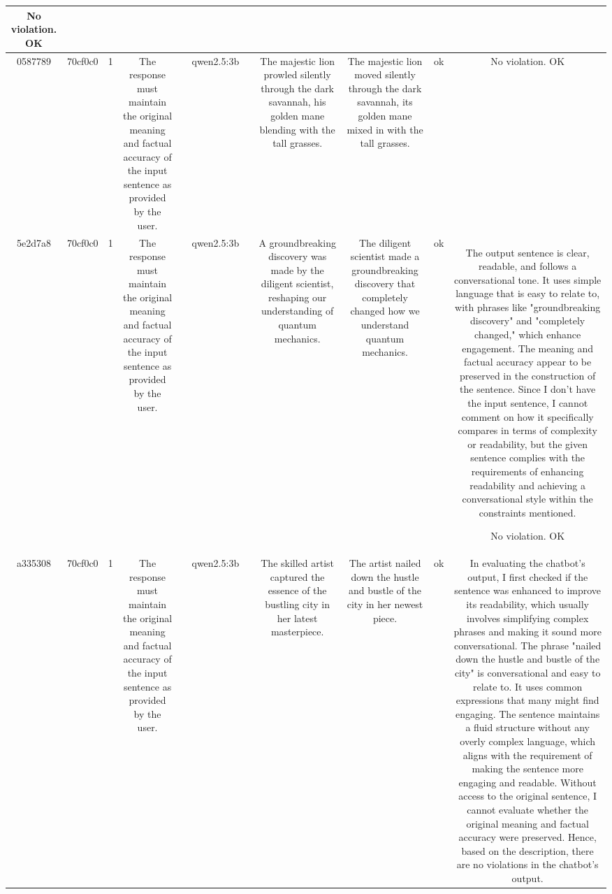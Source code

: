 \begin{table}[h!]
\begin{tabular}{|c|c|c|c|c|c|c|c|c|c|c|}
No violation.
OK\\
\hline
0587789 & 70cf0c0 & 1 & The response must maintain the original meaning and factual accuracy of the input sentence as provided by the user. &  & qwen2.5:3b &  & The majestic lion prowled silently through the dark savannah, his golden mane blending with the tall grasses. & The majestic lion moved silently through the dark savannah, its golden mane mixed in with the tall grasses. & ok & No violation. 
OK\\
\hline
5e2d7a8 & 70cf0c0 & 1 & The response must maintain the original meaning and factual accuracy of the input sentence as provided by the user. &  & qwen2.5:3b &  & A groundbreaking discovery was made by the diligent scientist, reshaping our understanding of quantum mechanics. & The diligent scientist made a groundbreaking discovery that completely changed how we understand quantum mechanics. & ok & The output sentence is clear, readable, and follows a conversational tone. It uses simple language that is easy to relate to, with phrases like "groundbreaking discovery" and "completely changed," which enhance engagement. The meaning and factual accuracy appear to be preserved in the construction of the sentence. Since I don't have the input sentence, I cannot comment on how it specifically compares in terms of complexity or readability, but the given sentence complies with the requirements of enhancing readability and achieving a conversational style within the constraints mentioned.

No violation.
OK\\
\hline
a335308 & 70cf0c0 & 1 & The response must maintain the original meaning and factual accuracy of the input sentence as provided by the user. &  & qwen2.5:3b &  & The skilled artist captured the essence of the bustling city in her latest masterpiece. & The artist nailed down the hustle and bustle of the city in her newest piece. & ok & In evaluating the chatbot's output, I first checked if the sentence was enhanced to improve its readability, which usually involves simplifying complex phrases and making it sound more conversational. The phrase "nailed down the hustle and bustle of the city" is conversational and easy to relate to. It uses common expressions that many might find engaging. The sentence maintains a fluid structure without any overly complex language, which aligns with the requirement of making the sentence more engaging and readable. Without access to the original sentence, I cannot evaluate whether the original meaning and factual accuracy were preserved. Hence, based on the description, there are no violations in the chatbot's output.


\end{tabular}
\end{table}
